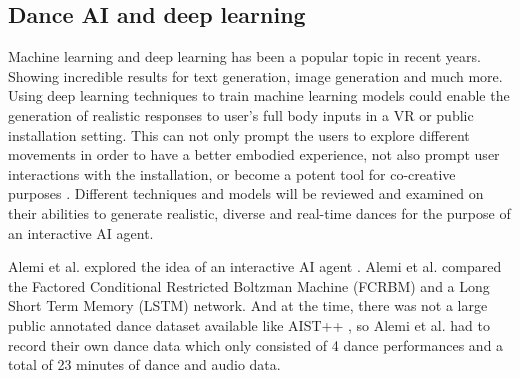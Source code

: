 \documentclass[final,5p,times,twocolumn,authoryear]{article}
\begin{document}


\subsection{Dance AI and deep learning}

Machine learning and deep learning has been a popular topic in recent
years. Showing incredible results for text generation, image generation
and much more. Using deep learning techniques to train machine learning
models could enable the generation of realistic responses to user's full
body inputs in a VR or public installation setting.  This can not only
prompt the users to explore different movements in order to have a
better embodied experience, not also prompt user interactions with the
installation, or become a potent tool for co-creative purposes
\cite{Wallace2023}.  Different techniques and models will be reviewed
and examined on their abilities to generate realistic, diverse and
real-time dances for the purpose of an interactive AI agent.

Alemi et al. explored the idea of an interactive AI agent
\cite{Alemi2017}. Alemi et al. compared the Factored Conditional
Restricted Boltzman Machine (FCRBM) and a Long Short Term Memory (LSTM)
network. And at the time, there was not a large public annotated dance
dataset available like AIST++ \cite{Li2021}, so Alemi et al. had to
record their own dance data which only consisted of 4 dance performances
and a total of 23 minutes of dance and audio data.
\end{document}
